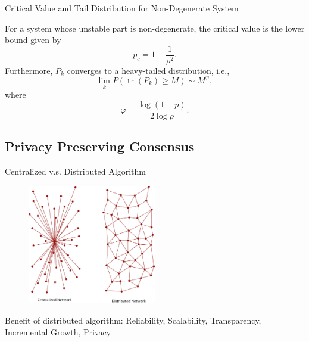 \documentclass[10pt]{beamer}
\DeclareMathOperator{\1}{\textbf{1}}
\DeclareMathOperator{\tr}{tr}
\begin{document}
%
      \begin{frame}{Critical Value and Tail Distribution for Non-Degenerate System}
	\begin{theorem}
	  For a system whose unstable part is non-degenerate, the critical value is the lower bound given by
	  \begin{displaymath}
	    p_c = 1-\frac{1}{\rho^2}.
	  \end{displaymath}
	  Furthermore, $P_k$ converges to a heavy-tailed distribution, i.e.,
	  \begin{displaymath}
	    \lim_k P(\tr(P_k)\geq M) \sim M^\varphi,
	  \end{displaymath}
	  where 
	  \begin{displaymath}
	    \varphi = \frac{\log(1-p)}{2\log \rho}.	
	  \end{displaymath}
	\end{theorem}
      \end{frame}

      \subsection{Privacy Preserving Consensus}

\frame{\tableofcontents[currentsection]}
      \begin{frame}{Centralized v.s. Distributed Algorithm}
	\begin{figure}[<+htpb+>]
	  \begin{center}
	    \includegraphics[width=0.50\textwidth]{centralized.png}
	  \end{center}
	\end{figure}
	Benefit of distributed algorithm: Reliability, Scalability, Transparency, Incremental Growth, Privacy
      \end{frame}
\end{document}
